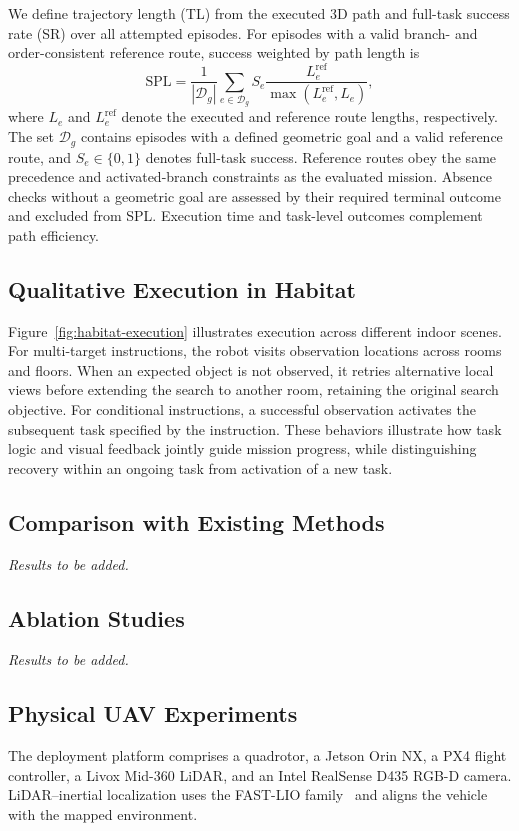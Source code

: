 \documentclass[letterpaper,10pt,journal]{IEEEtran}
\begin{document}
We define trajectory length (TL) from the executed 3D path and full-task success rate (SR) over all attempted episodes. For episodes with a valid branch- and order-consistent reference route, success weighted by path length is
\begin{equation}
\mathrm{SPL}=\frac{1}{|\mathcal D_g|}\sum_{e\in\mathcal D_g}
S_e\frac{L_e^{\mathrm{ref}}}{\max(L_e^{\mathrm{ref}},L_e)},
\label{eq:spl}
\end{equation}
where $L_e$ and $L_e^{\mathrm{ref}}$ denote the executed and reference route lengths, respectively. The set $\mathcal D_g$ contains episodes with a defined geometric goal and a valid reference route, and $S_e\in\{0,1\}$ denotes full-task success. Reference routes obey the same precedence and activated-branch constraints as the evaluated mission. Absence checks without a geometric goal are assessed by their required terminal outcome and excluded from SPL. Execution time and task-level outcomes complement path efficiency.

\subsection{Qualitative Execution in Habitat}
\label{sec:qualitative}
Figure~\ref{fig:habitat-execution} illustrates execution across different indoor scenes. For multi-target instructions, the robot visits observation locations across rooms and floors. When an expected object is not observed, it retries alternative local views before extending the search to another room, retaining the original search objective. For conditional instructions, a successful observation activates the subsequent task specified by the instruction. These behaviors illustrate how task logic and visual feedback jointly guide mission progress, while distinguishing recovery within an ongoing task from activation of a new task.

\subsection{Comparison with Existing Methods}
\label{sec:comparison}
\emph{Results to be added.}

\subsection{Ablation Studies}
\label{sec:ablation}
\emph{Results to be added.}

\subsection{Physical UAV Experiments}
\label{sec:realworld}
The deployment platform comprises a quadrotor, a Jetson Orin NX, a PX4 flight controller, a Livox Mid-360 LiDAR, and an Intel RealSense D435 RGB-D camera. LiDAR--inertial localization uses the FAST-LIO family~\cite{xu2021fastlio} and aligns the vehicle with the mapped environment.
\end{document}
